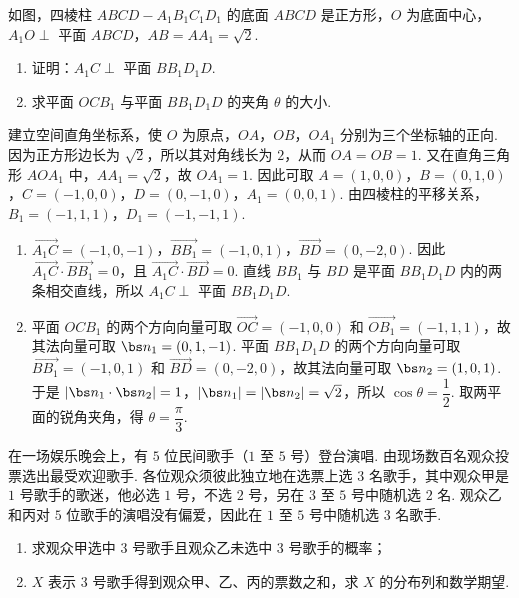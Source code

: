 \begin{problem}
如图，四棱柱 \(ABCD-A_{1}B_{1}C_{1}D_{1}\) 的底面 \(ABCD\) 是正方形，\(O\) 为底面中心，\(A_{1}O\perp\) 平面 \(ABCD\)，\(AB=AA_{1}=\sqrt2\).

\begin{enumerate}
\item 证明：\(A_{1}C\perp\) 平面 \(BB_{1}D_{1}D\).
\item 求平面 \(OCB_{1}\) 与平面 \(BB_{1}D_{1}D\) 的夹角 \(\theta\) 的大小.
\end{enumerate}


\end{problem}

\begin{solution}
建立空间直角坐标系，使 \(O\) 为原点，\(OA\)，\(OB\)，\(OA_1\) 分别为三个坐标轴的正向. 因为正方形边长为 \(\sqrt2\)，所以其对角线长为 \(2\)，从而 \(OA=OB=1\). 又在直角三角形 \(AOA_1\) 中，\(AA_1=\sqrt2\)，故 \(OA_1=1\). 因此可取
\(A=(1,0,0)\)，\(B=(0,1,0)\)，\(C=(-1,0,0)\)，\(D=(0,-1,0)\)，\(A_1=(0,0,1)\). 由四棱柱的平移关系，\(B_1=(-1,1,1)\)，\(D_1=(-1,-1,1)\).

\begin{enumerate}
\item \(\overrightarrow{A_1C}=(-1,0,-1)\)，\(\overrightarrow{BB_1}=(-1,0,1)\)，\(\overrightarrow{BD}=(0,-2,0)\). 因此 \(\overrightarrow{A_1C}\cdot\overrightarrow{BB_1}=0\)，且 \(\overrightarrow{A_1C}\cdot\overrightarrow{BD}=0\). 直线 \(BB_1\) 与 \(BD\) 是平面 \(BB_1D_1D\) 内的两条相交直线，所以 \(A_1C\perp\) 平面 \(BB_1D_1D\).
\item 平面 \(OCB_1\) 的两个方向向量可取 \(\overrightarrow{OC}=(-1,0,0)\) 和 \(\overrightarrow{OB_1}=(-1,1,1)\)，故其法向量可取 \(\bs n_1=(0,1,-1)\). 平面 \(BB_1D_1D\) 的两个方向向量可取 \(\overrightarrow{BB_1}=(-1,0,1)\) 和 \(\overrightarrow{BD}=(0,-2,0)\)，故其法向量可取 \(\bs n_2=(1,0,1)\). 于是 \(\left|\bs n_1\cdot\bs n_2\right|=1\)，\(\left|\bs n_1\right|=\left|\bs n_2\right|=\sqrt2\)，所以 \(\cos\theta=\dfrac12\). 取两平面的锐角夹角，得 \(\theta=\dfrac\pi3\).
\end{enumerate}
\end{solution}

\begin{problem}
在一场娱乐晚会上，有 \(5\) 位民间歌手（\(1\) 至 \(5\) 号）登台演唱. 由现场数百名观众投票选出最受欢迎歌手. 各位观众须彼此独立地在选票上选 \(3\) 名歌手，其中观众甲是 \(1\) 号歌手的歌迷，他必选 \(1\) 号，不选 \(2\) 号，另在 \(3\) 至 \(5\) 号中随机选 \(2\) 名. 观众乙和丙对 \(5\) 位歌手的演唱没有偏爱，因此在 \(1\) 至 \(5\) 号中随机选 \(3\) 名歌手.

\begin{enumerate}
\item 求观众甲选中 \(3\) 号歌手且观众乙未选中 \(3\) 号歌手的概率；
\item \(X\) 表示 \(3\) 号歌手得到观众甲、乙、丙的票数之和，求 \(X\) 的分布列和数学期望.
\end{enumerate}

\end{problem}

